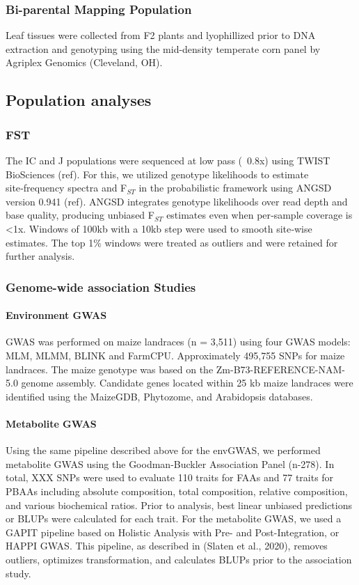 \documentclass[pdflatex,sn-mathphys-num]{sn-jnl}%
\theoremstyle{thmstyleone}%
\theoremstyle{thmstyletwo}%
\theoremstyle{thmstylethree}%
\begin{document}
\subsubsection{Bi-parental Mapping Population}
Leaf tissues were collected from F2 plants and lyophillized prior to DNA extraction and genotyping using the mid-density temperate corn panel by Agriplex Genomics (Cleveland, OH).

\subsection{Population analyses}
\subsubsection{FST}
The IC and J populations were sequenced at low pass (~0.8x) using TWIST BioSciences (ref). For this, we utilized genotype likelihoods to estimate site‑frequency spectra and F$_{ST}$ in the probabilistic framework using ANGSD  version 0.941 (ref). ANGSD integrates genotype likelihoods over read depth and base quality, producing unbiased F$_{ST}$ estimates even when per‑sample coverage is <1x. Windows of 100kb with a 10kb step were used to smooth site‑wise estimates. The top 1\% windows were treated as outliers and were retained for further analysis.  

\subsubsection{Genome-wide association Studies}
\paragraph{Environment GWAS}
GWAS was performed on maize landraces (n = 3,511) using four GWAS models: MLM, MLMM, BLINK and FarmCPU. Approximately 495,755 SNPs for maize landraces. The maize genotype was based on the Zm-B73-REFERENCE-NAM-5.0 genome assembly. Candidate genes located within 25 kb maize landraces were identified using the MaizeGDB, Phytozome, and Arabidopsis databases. 

\paragraph{Metabolite GWAS}
Using the same pipeline described above for the envGWAS, we performed metabolite GWAS using the Goodman-Buckler Association Panel (n-278). In total, XXX SNPs were used to evaluate 110 traits for FAAs and 77 traits for PBAAs including absolute composition, total composition, relative composition, and various biochemical ratios. Prior to analysis, best linear unbiased predictions or BLUPs were calculated for each trait. For the metabolite GWAS, we used a GAPIT pipeline based on Holistic Analysis with Pre- and Post-Integration, or HAPPI GWAS. This pipeline, as described in (Slaten et al., 2020), removes outliers, optimizes transformation, and calculates BLUPs prior to the association study. 
\end{document}
